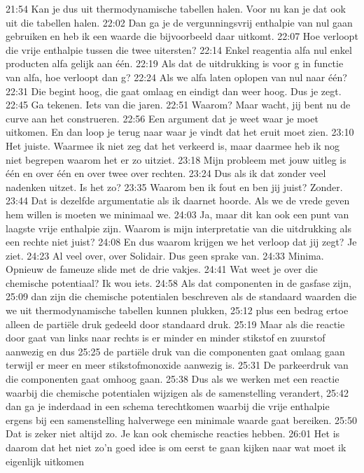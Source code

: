 21:54
Kan je dus uit thermodynamische tabellen halen. Voor nu kan je dat ook uit die tabellen halen.
22:02
Dan ga je de vergunningsvrij enthalpie van nul gaan gebruiken en heb ik een waarde die bijvoorbeeld daar uitkomt.
22:07
Hoe verloopt die vrije enthalpie tussen die twee uitersten?
22:14
Enkel reagentia alfa nul enkel producten alfa gelijk aan één.
22:19
Als dat de uitdrukking is voor g in functie van alfa, hoe verloopt dan g?
22:24
Als we alfa laten oplopen van nul naar één?
22:31
Die begint hoog, die gaat omlaag en eindigt dan weer hoog. Dus je zegt.
22:45
Ga tekenen. Iets van die jaren.
22:51
Waarom? Maar wacht, jij bent nu de curve aan het construeren.
22:56
Een argument dat je weet waar je moet uitkomen. En dan loop je terug naar waar je vindt dat het eruit moet zien.
23:10
Het juiste. Waarmee ik niet zeg dat het verkeerd is, maar daarmee heb ik nog niet begrepen waarom het er zo uitziet.
23:18
Mijn probleem met jouw uitleg is één en over één en over twee over rechten.
23:24
Dus als ik dat zonder veel nadenken uitzet. Is het zo?
23:35
Waarom ben ik fout en ben jij juist? Zonder.
23:44
Dat is dezelfde argumentatie als ik daarnet hoorde. Als we de vrede geven hem willen is moeten we minimaal we.
24:03
Ja, maar dit kan ook een punt van laagste vrije enthalpie zijn. Waarom is mijn interpretatie van die uitdrukking als een rechte niet juist?
24:08
En dus waarom krijgen we het verloop dat jij zegt? Je ziet.
24:23
Al veel over, over Solidair. Dus geen sprake van.
24:33
Minima. Opnieuw de fameuze slide met de drie vakjes.
24:41
Wat weet je over die chemische potentiaal? Ik wou iets.
24:58
Als dat componenten in de gasfase zijn,
25:09
dan zijn die chemische potentialen beschreven als de standaard waarden die we uit thermodynamische tabellen kunnen plukken,
25:12
plus een bedrag ertoe alleen de partiële druk gedeeld door standaard druk.
25:19
Maar als die reactie door gaat van links naar rechts is er minder en minder stikstof en zuurstof aanwezig en dus
25:25
de partiële druk van die componenten gaat omlaag gaan terwijl er meer en meer stikstofmonoxide aanwezig is.
25:31
De parkeerdruk van die componenten gaat omhoog gaan.
25:38
Dus als we werken met een reactie waarbij die chemische potentialen wijzigen als de samenstelling verandert,
25:42
dan ga je inderdaad in een schema terechtkomen waarbij die vrije enthalpie ergens bij een samenstelling halverwege een minimale waarde gaat bereiken.
25:50
Dat is zeker niet altijd zo. Je kan ook chemische reacties hebben.
26:01
Het is daarom dat het niet zo'n goed idee is om eerst te gaan kijken naar wat moet ik eigenlijk uitkomen
